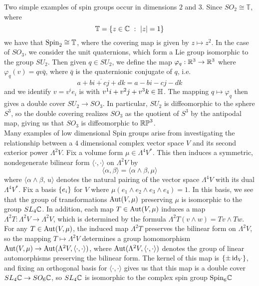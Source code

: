Two simple examples of spin groups occur in dimensions $2$ and $3$.
Since $SO_2 \cong \mathbb{T}$, where
\[
\mathbb{T} = \left\lbrace z \in \mathbb{C} ~:~ |z| = 1 \right\rbrace
\]
we have that $\mathrm{Spin}_2 \cong \mathbb{T}$, where the covering map is given
by $z \mapsto z^2$. In the case of $SO_3$, we consider the unit quaternions,
which form a Lie group isomorphic to the group $SU_2$. Then given $q \in SU_2$, we define
the map $\varphi_q : \mathbb{R}^3 \to \mathbb{R}^3$ where $\varphi_q(v) = qv\bar{q}$, where
$\bar{q}$ is the quaternionic conjugate of $q$, i.e.
\[
\overline{a + bi + cj +dk} = a -bi -cj -dk
\]
and we identify $v = v^ie_i$ is  with $v^1 i + v^2j + v^3k \in \mathbb{H}$.
The mapping $q \mapsto \varphi_q$ then gives a double cover $SU_2 \to SO_3$.
In particular, $SU_2$ is diffeomorphic to the sphere $S^3$, so the double
covering realizes $SO_3$ as the quotient of $S^3$ by the antipodal map,
giving us that $SO_3$ is diffeomorphic to $\mathbb{RP}^3$. \\

Many examples of low dimensional Spin groups arise from investigating the
relationship between a $4$ dimensional complex vector space $V$ and its second
exterior power $\Lambda^2V$. Fix a volume form $\mu \in \Lambda^4V^*$. This then
induces a symmetric, nondegenerate bilinear form $\langle \cdot,\cdot \rangle$
on $\Lambda^2V$ by
\[
\langle \alpha,\beta \rangle = \langle \alpha \wedge \beta, \mu \rangle
\]
where $\langle \alpha \wedge \beta, \,u \rangle$ denotes the natural pairing of
the vector space $\Lambda^4V$ with its dual $\Lambda^4V^*$. Fix a basis
$\left\lbrace e_i \right\rbrace$ for $V$ where $\mu(e_1 \wedge e_2 \wedge e_3 \wedge e_4) = 1$. In this basis,
we see that the group of transformations $\operatorname{Aut}(V, \mu)$ preserving $\mu$ is
isomorphic to the group $SL_4\mathbb{C}$. In addition, each map $T \in \operatorname{Aut}(V, \mu)$
induces a map $\Lambda^2 T : \Lambda^2V \to \Lambda^2V$, which is determined
by the formula $\Lambda^2 T(v \wedge w) = Tv \wedge Tw$. For any $T \in \operatorname{Aut}(V, \mu)$,
the induced map $\Lambda^2 T$ preserves the bilinear form on $\Lambda^2V$, so the
mapping $T \mapsto \Lambda^2V$ determines a group homomorphism
$\operatorname{Aut}(V, \mu) \to \operatorname{Aut}(\Lambda^2V, \langle \cdot,\cdot \rangle)$, where
$\operatorname{Aut}(\Lambda^2V,\langle\cdot,\cdot\rangle)$ denotes the group of linear automorphisms
preserving the bilinear form. The kernel of this map is $\left\lbrace \pm \operatorname{id}_V \right\rbrace$, and fixing
an orthogonal basis for $\langle\cdot,\cdot\rangle$ gives us that this map is
a double cover $SL_4\mathbb{C} \to SO_6\mathbb{C}$, so $SL_4\mathbb{C}$ is isomorphic to the
complex spin group $\mathrm{Spin}_6\mathbb{C}$ \\

